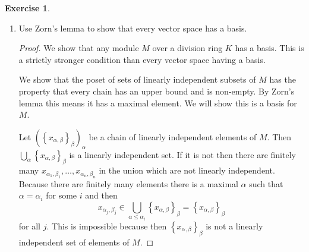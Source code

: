 \documentclass{article}
\newcommand{\Q}{\mathbb{Q}}
\newcommand{\R}{\mathbb{R}}
\newcommand{\set}[1]{\left\{#1\right\}}
\newtheorem{lemma}{Lemma}
\theoremstyle{definition}
\newtheorem{question}{Exercise}
\begin{document}
\begin{question}
\begin{enumerate}[(1)]
\begin{proof}
\begin{lemma}[Restriction of scalars]
\begin{proof}
                          Because \(f\) preserves \(0,1\in R\), we know that
                          \(1m=f(1)m=m\) and similarly for \(0\) we have
                          \(0m=0\).

                          Because ring morphisms are additive we have
                          \[
                              (r+r')m=f(r+r')m=(f(r)+f(r'))m=rm+r'm.
                          \]
                          The other distributivity follows immediately from the
                          definition of the multiplication.

                          Associativity holds because
                          \(f(rr')m=(f(r)f(r'))m=f(r)(f(r')m)\) by
                          multiplicativity of ring morphisms.

                          This shows \(M\) is an \(R\)-module.
                      \end{proof}
                  \end{lemma}

                  Now \(\R\) is a \(\Q\)-module (i.e. vector space) by
                  restriction of scalars through the unique morphism \(\Q\to
                  \R\).
              \end{proof}

        \item Use Zorn's lemma to show that every vector space has a basis.

              \begin{proof}
                  We show that any module \(M\) over a division ring \(K\) has a
                  basis. This is a strictly stronger condition than every vector
                  space having a basis.

                  We show that the poset of sets of linearly independent subsets
                  of \(M\) has the property that every chain has an upper bound
                  and is non-empty. By Zorn's lemma this means it has a maximal
                  element. We will show this is a basis for \(M\).

                  Let \((\set{x_{\alpha,\beta}}_{\beta})_{\alpha}\) be a chain
                  of linearly independent elements of \(M\). Then
                  \(\bigcup_{\alpha}\set{x_{\alpha,\beta}}_{\beta}\) is a
                  linearly independent set. If it is not then there are finitely
                  many
                  \(x_{\alpha_{1},\beta_{1}},\ldots,x_{\alpha_{n},\beta_{n}}\)
                  in the union which are not linearly independent. Because there
                  are finitely many elements there is a maximal \(\alpha\) such
                  that \(\alpha=\alpha_{i}\) for some \(i\) and then
                  \[
                      x_{\alpha_{j},\beta_{j}}\in\bigcup_{\alpha\leq\alpha_{i}}\set{x_{\alpha,\beta}}_{\beta}=\set{x_{\alpha,\beta}}_{\beta}
                  \]
                  for all \(j\). This is impossible because then
                  \(\set{x_{\alpha,\beta}}_{\beta}\) is not a linearly
                  independent set of elements of \(M\).


\end{proof}
\end{enumerate}
\end{question}
\end{document}
